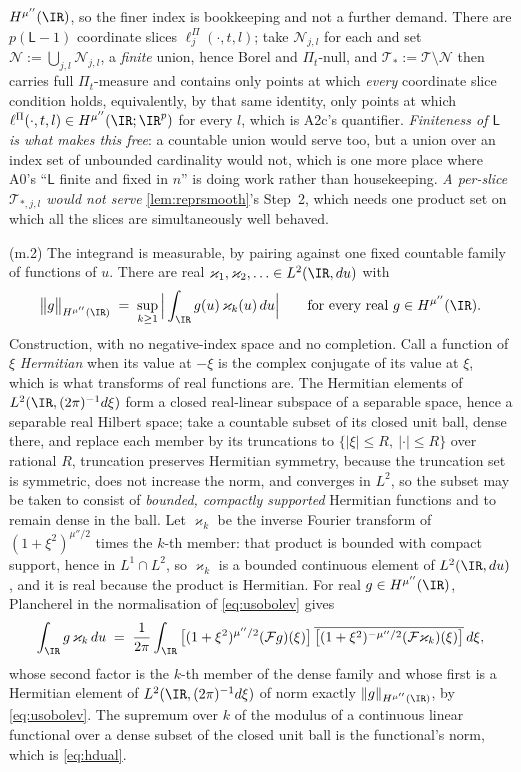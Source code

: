 $H^{\mu''}(\IR)$, so the finer index is bookkeeping and not a further demand. There are
$p(\mathsf L-1)$ coordinate slices $\ell^\Pi_j(\cdot,t,l)$; take $\mathcal N_{j,l}$ for each and set
$\mathcal N:=\bigcup_{j,l}\mathcal N_{j,l}$, a \emph{finite} union, hence Borel and $\Pi_t$-null, and
$\mathcal T_\ast:=\mathcal T\setminus\mathcal N$ then carries full $\Pi_t$-measure and contains only
points at which \emph{every} coordinate slice condition holds, equivalently, by that same identity,
only points at which $\ell^\Pi(\cdot,t,l)\in H^{\mu''}(\IR;\IR^{p})$ for every $l$, which is A2c's
quantifier. \emph{Finiteness of $\mathsf L$ is what makes this
free}: a countable union would serve too, but a union over an index set of unbounded cardinality would
not, which is one more place where A0's ``$\mathsf L$ finite and fixed in $n$'' is doing work rather
than housekeeping. \emph{A per-slice $\mathcal T_{\ast,j,l}$ would not serve} \cref{lem:reprsmooth}'s
Step~2, which needs one product set on which all the slices are simultaneously well behaved.

\textup{(m.2)} The integrand is measurable, by pairing against one fixed countable family of
functions of $u$. There are real $\varkappa_1,\varkappa_2,\ldots\in L^{2}(\IR,du)$ with
\begin{equation}\label{eq:hdual}
\big\|g\big\|_{H^{\mu''}(\IR)}\;=\;\sup_{k\ge1}\Big|\int_{\IR}g(u)\,\varkappa_k(u)\,du\Big|
\qquad\text{for every real }g\in H^{\mu''}(\IR).
\end{equation}
Construction, with no negative-index space and no completion. Call a function of $\xi$
\emph{Hermitian} when its value at $-\xi$ is the complex conjugate of its value at $\xi$, which is what
transforms of real functions are. The Hermitian elements of $L^{2}(\IR,(2\pi)^{-1}d\xi)$ form a closed
real-linear subspace of a separable space, hence a separable real Hilbert space; take a countable subset
of its closed unit ball, dense there, and replace each member by its truncations to
$\{|\xi|\le R,\ |\cdot|\le R\}$ over rational $R$, truncation preserves Hermitian symmetry, because
the truncation set is symmetric, does not increase the norm, and converges in $L^{2}$, so the subset
may be taken to consist of \emph{bounded, compactly supported} Hermitian functions and to remain dense in
the ball. Let $\varkappa_k$ be the inverse Fourier transform of $(1+\xi^{2})^{\mu''/2}$ times the $k$-th
member: that product is bounded with compact support, hence in $L^{1}\cap L^{2}$, so $\varkappa_k$ is a
bounded continuous element of $L^{2}(\IR,du)$, and it is real because the product is Hermitian. For real
$g\in H^{\mu''}(\IR)$, Plancherel in the normalisation of \eqref{eq:usobolev} gives
\[
\int_{\IR}g\,\varkappa_k\,du
\;=\;\frac1{2\pi}\int_{\IR}\big[(1+\xi^{2})^{\mu''/2}(\mathcal Fg)(\xi)\big]\,
\overline{\big[(1+\xi^{2})^{-\mu''/2}(\mathcal F\varkappa_k)(\xi)\big]}\,d\xi ,
\]
whose second factor is the $k$-th member of the dense family and whose first is a Hermitian element of
$L^{2}(\IR,(2\pi)^{-1}d\xi)$ of norm exactly $\|g\|_{H^{\mu''}(\IR)}$, by \eqref{eq:usobolev}. The
supremum over $k$ of the modulus of a continuous linear functional over a dense subset of the closed unit
ball is the functional's norm, which is \eqref{eq:hdual}.

